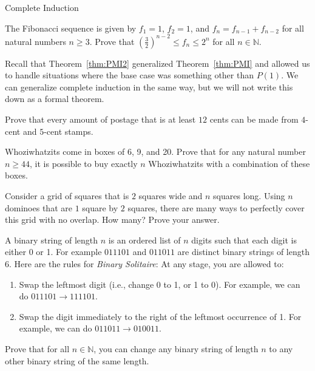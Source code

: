 \begin{section}{Complete Induction}

\begin{problem}\label{prob:Fibonacci}
The Fibonacci sequence is given by $f_1=1$, $f_2=1$, and $f_n=f_{n-1}+f_{n-2}$ for all natural numbers $n \geq 3$.  Prove that $\left(\frac{3}{2}\right)^{n-2}\leq f_n\leq 2^n$ for all $n\in\mathbb{N}$.
\end{problem}

Recall that Theorem~\ref{thm:PMI2} generalized Theorem~\ref{thm:PMI} and allowed us to handle situations where the base case was something other than $P(1)$.  We can generalize complete induction in the same way, but we will not write this down as a formal theorem.

\begin{problem}
Prove that every amount of postage that is at least $12$ cents can be made from $4$-cent and $5$-cent stamps.
\end{problem}


\begin{problem}
Whoziwhatzits come in boxes of 6, 9, and 20. Prove that for any natural number $n \geq 44$, it is possible to buy exactly $n$ Whoziwhatzits with a combination of these boxes.
\end{problem}

\begin{problem}
Consider a grid of squares that is $2$ squares wide and $n$ squares long.  Using $n$ dominoes that are $1$ square by $2$ squares, there are many ways to perfectly cover this grid with no overlap.  How many?  Prove your answer.
\end{problem}

\begin{problem}
A binary string of length $n$ is an ordered list of $n$ digits such that each digit is either 0 or 1. For example $011101$ and $011011$ are distinct binary strings of length 6. Here are the rules for \emph{Binary Solitaire}: At any stage, you are allowed to:
\begin{enumerate}[label=\textrm{(\roman*)}]
\item Swap the leftmost digit (i.e., change 0 to 1, or 1 to 0). For example, we can do $011101\to 111101$.
\item Swap the digit immediately to the right of the leftmost occurrence of 1. For example, we can do $011011\to 010011$.
\end{enumerate}
Prove that for all $n\in\mathbb{N}$, you can change any binary string of length $n$ to any other binary string of the same length.
\end{problem}


\end{section}
